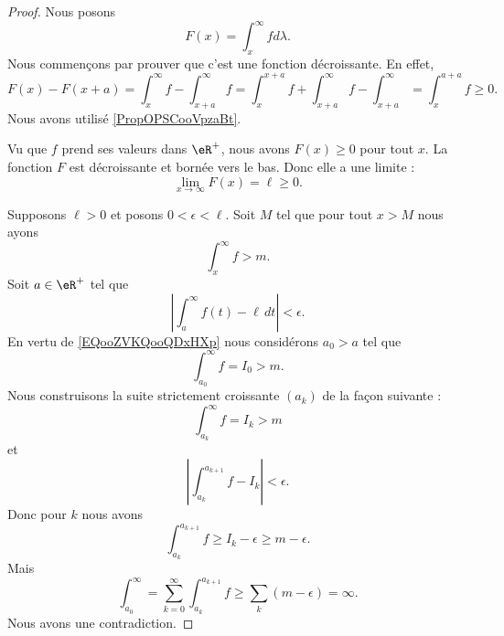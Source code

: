 \begin{proof}
	Nous posons
	\begin{equation}
		F(x)= \int_x^{\infty}fd\lambda.
	\end{equation}
	Nous commençons par prouver que c'est une fonction décroissante. En effet,
	\begin{equation}
		F(x)-F(x+a)=\int_{x}^{\infty}f-\int_{x+a}^{\infty}f=\int_{x}^{x+a}f+\int_{x+a}^{\infty}f-\int_{x+a}^{\infty}=\int_x^{a+a}f\geq 0.
	\end{equation}
	Nous avons utilisé \ref{PropOPSCooVpzaBt}.

	Vu que \( f\) prend ses valeurs dans \( \eR^+\), nous avons \( F(x)\geq 0\) pour tout \( x\). La fonction \( F\) est décroissante et bornée vers le bas. Donc elle a une limite :
	\begin{equation}
		\lim_{x\to \infty} F(x)=\ell\geq 0.
	\end{equation}

	Supposons \( \ell >0\) et posons \( 0<\epsilon<\ell\). Soit \( M\) tel que pour tout \( x>M\) nous ayons
	\begin{equation}        \label{EQooZVKQooQDxHXp}
		\int_x^{\infty}f>m.
	\end{equation}
	Soit \( a\in \eR^+\) tel que
	\begin{equation}
		| \int_a^{\infty}f(t)-\ell\,dt |<\epsilon.
	\end{equation}
	En vertu de \eqref{EQooZVKQooQDxHXp} nous considérons \( a_0>a\) tel que
	\begin{equation}
		\int_{a_0}^{\infty}f=I_0>m.
	\end{equation}
	Nous construisons la suite strictement croissante \( (a_k)\) de la façon suivante :
	\begin{equation}
		\int_{a_k}^{\infty}f=I_k>m
	\end{equation}
	et
	\begin{equation}
		| \int_{a_k}^{a_{k+1}}f-I_k |<\epsilon.
	\end{equation}
	Donc pour \( k\) nous avons
	\begin{equation}
		\int_{a_k}^{a_{k+1}}f\geq I_k-\epsilon\geq m-\epsilon.
	\end{equation}
	Mais
	\begin{equation}
		\int_{a_0}^{\infty}=\sum_{k=0}^{\infty}\int_{a_k}^{a_{k+1}}f\geq \sum_k(m-\epsilon)=\infty.
	\end{equation}
	Nous avons une contradiction.
\end{proof}


